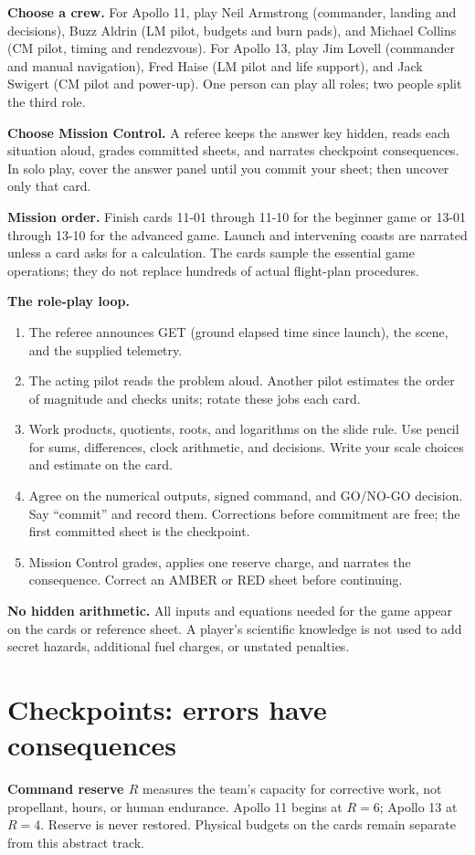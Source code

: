 \documentclass[11pt]{article}
\begin{document}
\textbf{Choose a crew.} For Apollo 11, play Neil Armstrong (commander,
landing and decisions), Buzz Aldrin (LM pilot, budgets and burn pads),
and Michael Collins (CM pilot, timing and rendezvous).
For Apollo 13, play Jim Lovell (commander and manual navigation),
Fred Haise (LM pilot and life support), and Jack Swigert (CM pilot and
power-up). One person can play all roles; two people split the third role.

\textbf{Choose Mission Control.} A referee keeps the answer key hidden,
reads each situation aloud, grades committed sheets, and narrates
checkpoint consequences. In solo play, cover the answer panel until
you commit your sheet; then uncover only that card.

\textbf{Mission order.} Finish cards 11-01 through 11-10 for the beginner
game or 13-01 through 13-10 for the advanced game. Launch and intervening
coasts are narrated unless a card asks for a calculation. The cards
sample the essential game operations; they do not replace hundreds
of actual flight-plan procedures.

\textbf{The role-play loop.}
\begin{enumerate}
\item The referee announces GET (ground elapsed time since launch),
the scene, and the supplied telemetry.
\item The acting pilot reads the problem aloud. Another pilot estimates
the order of magnitude and checks units; rotate these jobs each card.
\item Work products, quotients, roots, and logarithms on the slide rule.
Use pencil for sums, differences, clock arithmetic, and decisions.
Write your scale choices and estimate on the card.
\item Agree on the numerical outputs, signed command, and GO/NO-GO
decision. Say ``commit'' and record them. Corrections before commitment
are free; the first committed sheet is the checkpoint.
\item Mission Control grades, applies one reserve charge, and narrates
the consequence. Correct an AMBER or RED sheet before continuing.
\end{enumerate}

\textbf{No hidden arithmetic.} All inputs and equations needed for the
game appear on the cards or reference sheet. A player's scientific
knowledge is not used to add secret hazards, additional fuel charges,
or unstated penalties.

\clearpage
\section*{Checkpoints: errors have consequences}
\textbf{Command reserve \(R\)} measures the team's capacity for
corrective work, not propellant, hours, or human endurance.
Apollo 11 begins at \(\boxed{R=6}\); Apollo 13 at \(\boxed{R=4}\).
Reserve is never restored. Physical budgets on the cards remain
separate from this abstract track.
\end{document}
